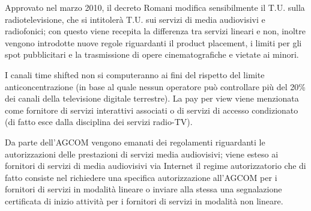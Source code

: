 Approvato nel marzo 2010, il decreto Romani modifica sensibilmente il T.U. sulla radiotelevisione, che si intitolerà T.U. sui servizi di media audiovisivi e radiofonici; con questo viene recepita la differenza tra servizi lineari e non, inoltre vengono introdotte nuove regole riguardanti il product placement, i limiti per gli spot pubblicitari e la trasmissione di opere cinematografiche e vietate ai minori.


I canali time shifted non si computeranno ai fini del rispetto del limite anticoncentrazione (in base al quale nessun operatore può controllare più del 20\% dei canali della televisione digitale terrestre). La pay per view viene menzionata come fornitore di servizi interattivi associati o di servizi di accesso condizionato (di fatto esce dalla disciplina dei servizi radio-TV). 

Da parte dell’AGCOM vengono emanati dei regolamenti riguardanti le autorizzazioni delle prestazioni di servizi media audiovisivi; viene esteso ai fornitori di servizi di media audiovisivi via Internet il regime autorizzatorio che di fatto consiste nel richiedere una specifica autorizzazione all’AGCOM per i fornitori di servizi in modalità lineare o inviare alla stessa una segnalazione certificata di inizio attività per i fornitori di servizi in modalità non lineare.